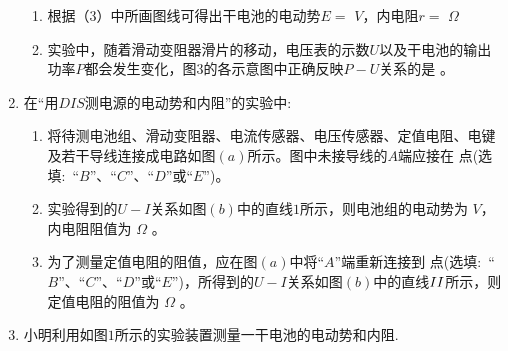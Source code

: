 \begin{enumerate}[leftmargin=0em]
\begin{enumerate}
\item 
根据（$ 3 $）中所画图线可得出干电池的电动势$ E= $  
$ V $，内电阻$ r= $  
$ \Omega $
\item 
实验中，随着滑动变阻器滑片的移动，电压表的示数$ U $以及干电池的输出功率$ P $都会发生变化，图$ 3 $的各示意图中正确反映$ P-U $关系的是  
。
\begin{figure}[h!]
\centering

\end{figure}





\end{enumerate}
















\newpage
\item 
{}
在“用$ DIS $测电源的电动势和内阻”的实验中:
\begin{figure}[h!]
\centering

\end{figure}

\begin{enumerate}
\renewcommand{\labelenumii}{(\arabic{enumii})}

\item 
将待测电池组、滑动变阻器、电流传感器、电压传感器、定值电阻、电键及若干导线连接成电路如图$ (a) $所示。图中未接导线的$ A $端应接在  
点(选填$ : $ “$ B $”、“$ C $”、“$ D $”或“$ E $”)。


\item 
实验得到的$ U-I $关系如图$ (b) $中的直线$ 1 $所示，则电池组的电动势为  
$ V $，内电阻阻值为  $ \Omega $ 
。


\item 
为了测量定值电阻的阻值，应在图$ (a) $中将“$ A $”端重新连接到  
点(选填$ : $ “$ B $”、“$ C $”、“$ D $”或“$ E $”)，所得到的$ U-I $关系如图$ (b) $中的直线$ \lmd{2} $所示，则定值电阻的阻值为  $ \Omega $
。

\end{enumerate}


\item 
{}
小明利用如图$ 1 $所示的实验装置测量一干电池的电动势和内阻.
\begin{figure}[h!]
\centering

\end{figure}


\end{enumerate}

